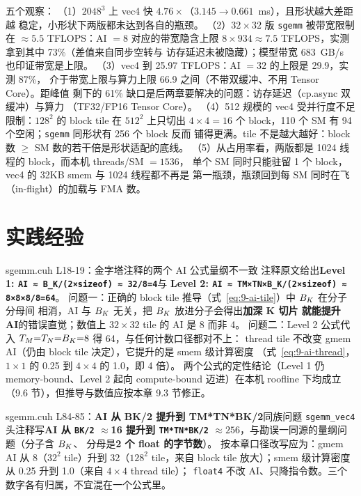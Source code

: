五个观察：
（1）$2048^3$ 上 vec4 快 $4.76\times$（$3.145 \to 0.661$~ms），且形状越大差距越
稳定，小形状下两版都未达到各自的瓶颈。
（2）$32{\times}32$ 版 \texttt{sgemm} 被带宽限制在 $\approx 5.5$ TFLOPS：AI $=8$ 对应的带宽隐含上限
$8 \times 934 \approx 7.5$ TFLOPS，实测拿到其中 73\%（差值来自同步空转与
访存延迟未被隐藏）；模型带宽 683~GB/s 也印证带宽是上限。
（3）vec4 到 25.97 TFLOPS：AI $=32$ 的上限是 29.9，实测 87\%，
介于带宽上限与算力上限 66.9 之间（不带双缓冲、不用 Tensor Core）。距峰值
剩下的 61\% 缺口是后两章要解决的问题：访存延迟（cp.async 双缓冲）与算力
（TF32/FP16 Tensor Core）。
（4）512 规模的 vec4 受并行度不足限制：$128^2$ 的 block tile 在 $512^2$ 上只切出
$4 \times 4 = 16$ 个 block，110 个 SM 有 94 个空闲；\texttt{sgemm} 同形状有 256 个 block 反而
铺得更满。tile 不是越大越好：block 数 $\ge$ SM 数的若干倍是形状适配的底线。
（5）从占用率看，两版都是 1024 线程的 block，而本机 threads/SM $=1536$，
单个 SM 同时只能驻留 1 个 block，vec4 的 32KB smem 与 1024 线程都不再是
第一瓶颈，瓶颈回到每 SM 同时在飞（in-flight）的加载与 FMA 数。

\section{实践经验}

\begin{kaogu}[F3]{sgemm.cuh L18-19：金字塔注释的两个 AI 公式量纲不一致}
  注释原文给出\textbf{Level 1: \texttt{AI ≈ B\_\allowbreak{}K/\allowbreak{}(2×sizeof) ≈ 32/\allowbreak{}8=\allowbreak{}4}}与
  \textbf{Level 2: \texttt{AI ≈ TM×TN×B\_\allowbreak{}K/\allowbreak{}(2×sizeof) ≈ 8×8×8/\allowbreak{}8=\allowbreak{}64}}。
  问题一：正确的 block tile 推导（式~\ref{eq:9-ai-tile}）中 $B\sb{K}$ 在分子分母间
  相消，AI 与 $B\sb{K}$ 无关，把 $B\sb{K}$ 放进分子会得出\textbf{加深 K 切片
  就能提升 AI}的错误直觉；数值上 $32 \times 32$ tile 的 AI 是 8 而非 4。
  问题二：Level 2 公式代入 $T\sb{M}{=}T\sb{N}{=}B\sb{K}{=}8$ 得 64，与任何计数口径都对不上：
  thread tile 不改变 gmem AI（仍由 block tile 决定），它提升的是 smem 级计算密度
  （式~\ref{eq:9-ai-thread}，$1 \times 1$ 的 0.25 到 $4 \times 4$ 的 1.0，即 4 倍）。
  两个公式的定性结论（Level 1 仍 memory-bound、Level 2 起向 compute-bound
  迈进）在本机 roofline 下均成立（9.6 节），但推导与数值应按本章 9.3 节修正。
\end{kaogu}

\begin{kaogu}[F3]{sgemm.cuh L84-85：\textbf{AI 从 BK/2 提升到 TM*TN*BK/2}同族问题}
  \texttt{sgemm\_vec4} 头注释写\textbf{AI 从 \texttt{BK/2} $\approx$16 提升到
  \texttt{TM*TN*BK/2} $\approx 256$}，与勘误一同源的量纲问题（分子含 $B\sb{K}$、
  分母是\textbf{2 个 float 的字节数}）。
  按本章口径改写应为：gmem AI 从 8（$32^2$ tile）升到 32（$128^2$ tile，来自
  block tile 放大）；smem 级计算密度从 0.25 升到 1.0（来自 $4 \times 4$ thread tile）；
  \texttt{float4} 不改 AI、只降指令数。三个数字各有归属，不宜混在一个公式里。
\end{kaogu}

